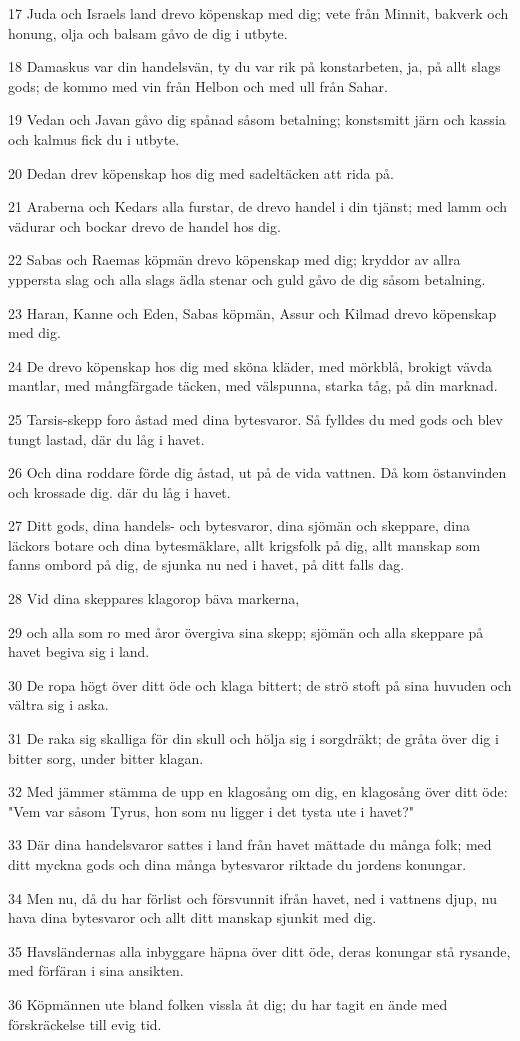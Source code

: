\par 17 Juda och Israels land drevo köpenskap med dig; vete från Minnit, bakverk och honung, olja och balsam gåvo de dig i utbyte.
\par 18 Damaskus var din handelsvän, ty du var rik på konstarbeten, ja, på allt slags gods; de kommo med vin från Helbon och med ull från Sahar.
\par 19 Vedan och Javan gåvo dig spånad såsom betalning; konstsmitt järn och kassia och kalmus fick du i utbyte.
\par 20 Dedan drev köpenskap hos dig med sadeltäcken att rida på.
\par 21 Araberna och Kedars alla furstar, de drevo handel i din tjänst; med lamm och vädurar och bockar drevo de handel hos dig.
\par 22 Sabas och Raemas köpmän drevo köpenskap med dig; kryddor av allra yppersta slag och alla slags ädla stenar och guld gåvo de dig såsom betalning.
\par 23 Haran, Kanne och Eden, Sabas köpmän, Assur och Kilmad drevo köpenskap med dig.
\par 24 De drevo köpenskap hos dig med sköna kläder, med mörkblå, brokigt vävda mantlar, med mångfärgade täcken, med välspunna, starka tåg, på din marknad.
\par 25 Tarsis-skepp foro åstad med dina bytesvaror. Så fylldes du med gods och blev tungt lastad, där du låg i havet.
\par 26 Och dina roddare förde dig åstad, ut på de vida vattnen. Då kom östanvinden och krossade dig. där du låg i havet.
\par 27 Ditt gods, dina handels- och bytesvaror, dina sjömän och skeppare, dina läckors botare och dina bytesmäklare, allt krigsfolk på dig, allt manskap som fanns ombord på dig, de sjunka nu ned i havet, på ditt falls dag.
\par 28 Vid dina skeppares klagorop bäva markerna,
\par 29 och alla som ro med åror övergiva sina skepp; sjömän och alla skeppare på havet begiva sig i land.
\par 30 De ropa högt över ditt öde och klaga bittert; de strö stoft på sina huvuden och vältra sig i aska.
\par 31 De raka sig skalliga för din skull och hölja sig i sorgdräkt; de gråta över dig i bitter sorg, under bitter klagan.
\par 32 Med jämmer stämma de upp en klagosång om dig, en klagosång över ditt öde: "Vem var såsom Tyrus, hon som nu ligger i det tysta ute i havet?"
\par 33 Där dina handelsvaror sattes i land från havet mättade du många folk; med ditt myckna gods och dina många bytesvaror riktade du jordens konungar.
\par 34 Men nu, då du har förlist och försvunnit ifrån havet, ned i vattnens djup, nu hava dina bytesvaror och allt ditt manskap sjunkit med dig.
\par 35 Havsländernas alla inbyggare häpna över ditt öde, deras konungar stå rysande, med förfäran i sina ansikten.
\par 36 Köpmännen ute bland folken vissla åt dig; du har tagit en ände med förskräckelse till evig tid.

